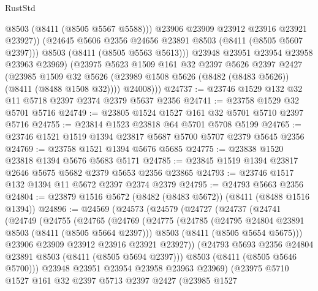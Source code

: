 \begin{lexlean}{RustStd}
\begin{coremodule}
                  @8503
                  (@8411 (@8505 @5567 @5588)))
                @23906
                @23909
                @23912
                @23916
                @23921
                @23927))
            (@24645 @5606 @2356 @24656 @23891 @8503 (@8411 (@8505 @5607 @2397)))
            @8503
            (@8411 (@8505 @5563 @5613)))
          @23948
          @23951
          @23954
          @23958
          @23963
          @23969)
        (@23975
          @5623
          @1509
          @161
          @32
          @2397
          @5626
          @2397
          @2427
          (@23985
            @1509
            @32
            @5626
            (@23989 @1508 @5626 (@8482 (@8483 @5626)) (@8411 (@8488 @1508 @32))))
          @24008)))
@24737 := @23746 @1529 @132 @32 @11 @5718 @2397 @2374 @2379 @5637 @2356
@24741 := @23758 @1529 @32 @5701 @5716
@24749 := @23805 @1524 @1527 @161 @32 @5701 @5710 @2397 @5716
@24755 := @23814 @1523 @23818 @64 @5701 @5708 @5199
@24765 := @23746 @1521 @1519 @1394 @23817 @5687 @5700 @5707 @2379 @5645 @2356
@24769 := @23758 @1521 @1394 @5676 @5685
@24775 := @23838 @1520 @23818 @1394 @5676 @5683 @5171
@24785 := @23845 @1519 @1394 @23817 @2646 @5675 @5682 @2379 @5653 @2356 @23865
@24793 := @23746 @1517 @132 @1394 @11 @5672 @2397 @2374 @2379
@24795 := @24793 @5663 @2356
@24804 := @23879 @1516 @5672 (@8482 (@8483 @5672)) (@8411 (@8488 @1516 @1394))
@24896 := @24569
    (@24573
      (@24579
        (@24727
          (@24737
            (@24741
              (@24749
                (@24755
                  (@24765
                    (@24769
                      (@24775
                        (@24785
                          (@24795 @24804 @23891 @8503 (@8411 (@8505 @5664 @2397)))
                          @8503
                          (@8411 (@8505 @5654 @5675)))
                        @23906
                        @23909
                        @23912
                        @23916
                        @23921
                        @23927))
                    (@24793 @5693 @2356 @24804 @23891 @8503 (@8411 (@8505 @5694 @2397)))
                    @8503
                    (@8411 (@8505 @5646 @5700)))
                  @23948
                  @23951
                  @23954
                  @23958
                  @23963
                  @23969)
                (@23975
                  @5710
                  @1527
                  @161
                  @32
                  @2397
                  @5713
                  @2397
                  @2427
                  (@23985
                    @1527

\end{coremodule}
\end{lexlean}
